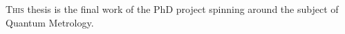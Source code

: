 
\lettrine[lines=2, findent=3pt,nindent=0pt]{T}{his} thesis is the final work of the PhD project spinning around the subject of Quantum Metrology.
